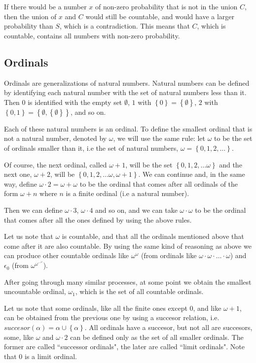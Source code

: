 \documentclass[a4paper
]{article}
\newcommand{\multime}[1]{\left\{ #1 \right\}}
\newcommand{\ghilimele}[1]{``#1"}
\begin{document}
If there would be a number $x$ of non-zero probability that is not in the
union $C$, then the union of $x$ and $C$ would still be countable, and
would have a larger probability than $S$, which is a contradiction.
This means that $C$, which is countable, contains all numbers with non-zero
probability.

\subsection{Ordinals}
\label{sec:ordinals}

Ordinals are generalizations of natural numbers. Natural numbers can be
defined by identifying each natural number with the set of natural numbers less
than it. Then $0$ is identified with the empty set $\emptyset$,
$1$ with $\multime{0}=\multime{\emptyset}$,
$2$ with $\multime{0, 1}=\multime{\emptyset, \multime{\emptyset}}$,
and so on.

Each of these natural numbers is an ordinal. To define the smallest ordinal
that is not a natural number, denoted by $\omega$, we will use the
same rule: let $\omega$ to be the set of ordinals smaller than it, i.e
the set of natural numbers, $\omega=\multime{0, 1, 2, \dots}$.

Of course, the next ordinal, called $\omega + 1$, will be the set
$\multime{0, 1, 2, \dots \omega}$ and the next one,
$\omega+2$, will be $\multime{0, 1, 2, \dots \omega, \omega+1}$. We can
continue and, in the same way, define $\omega\cdot 2=\omega+\omega$ to be
the ordinal that comes after all ordinals of the form $\omega+n$
where $n$ is a finite ordinal (i.e a natural number).

Then we can define $\omega\cdot 3$, $\omega\cdot 4$ and so on, and we can
take $\omega\cdot \omega$ to be the ordinal that comes after all the ones
defined by using the above rules.

Let us note that $\omega$ is countable, and that all the ordinals mentioned
above that come after it are also countable. By using the same kind of
reasoning as above we can produce other countable ordinals like
$\omega^\omega$ (from ordinals like $\omega\cdot\omega\cdot\dots\cdot\omega$)
and $\epsilon_0$ (from $\omega^{\omega^{\cdots^\omega}}$).

After going through many similar processes, at some point we obtain the
smallest uncountable ordinal, $\omega_1$, which is the set of all
countable ordinals.

Let us note that some ordinals, like all the finite ones except $0$,
and like $\omega+1$, can be obtained from the previous one by using
a succesor relation, i.e. $succesor(\alpha) = \alpha\cup\multime{\alpha}$.
All ordinals have a succesor, but not all are succesors, some, like
$\omega$ and $\omega\cdot 2$ can be defined only as the set of all
smaller ordinals. The former are called \ghilimele{successor ordinals},
the later are called \ghilimele{limit ordinals}. Note that $0$ is a limit
ordinal.
\end{document}
